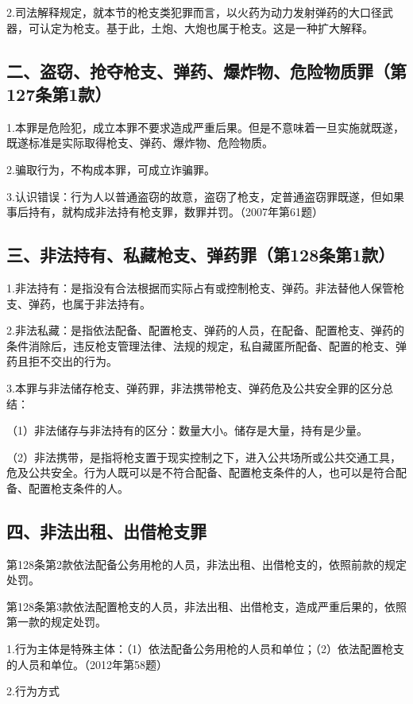 2.司法解释规定，就本节的枪支类犯罪而言，以火药为动力发射弹药的大口径武器，可认定为枪支。基于此，土炮、大炮也属于枪支。这是一种扩大解释。

\subsection*{二、盗窃、抢夺枪支、弹药、爆炸物、危险物质罪（第127条第1款）}

1.本罪是危险犯，成立本罪不要求造成严重后果。但是不意味着一旦实施就既遂，既遂标准是实际取得枪支、弹药、爆炸物、危险物质。

2.骗取行为，不构成本罪，可成立诈骗罪。

3.认识错误：行为人以普通盗窃的故意，盗窃了枪支，定普通盗窃罪既遂，但如果事后持有，就构成非法持有枪支罪，数罪并罚。（2007年第61题）

\subsection*{三、非法持有、私藏枪支、弹药罪（第128条第1款）}

1.非法持有：是指没有合法根据而实际占有或控制枪支、弹药。非法替他人保管枪支、弹药，也属于非法持有。

2.非法私藏：是指依法配备、配置枪支、弹药的人员，在配备、配置枪支、弹药的条件消除后，违反枪支管理法律、法规的规定，私自藏匿所配备、配置的枪支、弹药且拒不交出的行为。

3.本罪与非法储存枪支、弹药罪，非法携带枪支、弹药危及公共安全罪的区分总结：

（1）非法储存与非法持有的区分：数量大小。储存是大量，持有是少量。

（2）非法携带，是指将枪支置于现实控制之下，进入公共场所或公共交通工具，危及公共安全。行为人既可以是不符合配备、配置枪支条件的人，也可以是符合配备、配置枪支条件的人。

\subsection*{四、非法出租、出借枪支罪}

第128条第2款依法配备公务用枪的人员，非法出租、出借枪支的，依照前款的规定处罚。

第128条第3款依法配置枪支的人员，非法出租、出借枪支，造成严重后果的，依照第一款的规定处罚。

1.行为主体是特殊主体：（1）依法配备公务用枪的人员和单位；（2）依法配置枪支的人员和单位。（2012年第58题）

2.行为方式

